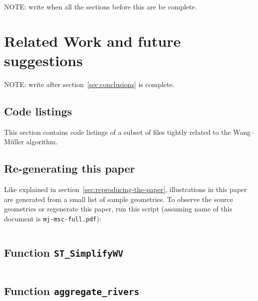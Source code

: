 \documentclass[a4paper]{article}
\newcommand{\inputcode}[2]{\inputminted[fontsize=\small]{#1}{#2}}
\newcommand{\inputcode}[2]{}
\newcommand{\WM}{Wang--M{\"u}ller}
\begin{document}
NOTE: write when all the sections before this are be complete.

\section{Related Work and future suggestions}
\label{sec:related_work}

NOTE: write after section~\ref{sec:conclusions} is complete.

\printbibliography

\begin{appendices}

\section{Code listings}

This section contains code listings of a subset of files tightly related to the
    {\WM} algorithm.

\subsection{Re-generating this paper}
\label{sec:code-regenerate}

Like explained in section~\ref{sec:reproducing-the-paper}, illustrations in
    this paper are generated from a small list of sample geometries. To observe
    the source geometries or regenerate this paper, run this script (assuming
    name of this document is {\tt mj-msc-full.pdf}):

\inputcode{bash}{extract-and-generate}

\subsection{Function \texttt{ST\_SimplifyWV}}
\inputcode{postgresql}{wm.sql}

\subsection{Function \texttt{aggregate\_rivers}}
\inputcode{postgresql}{aggregate-rivers.sql}

\end{appendices}
\end{document}
